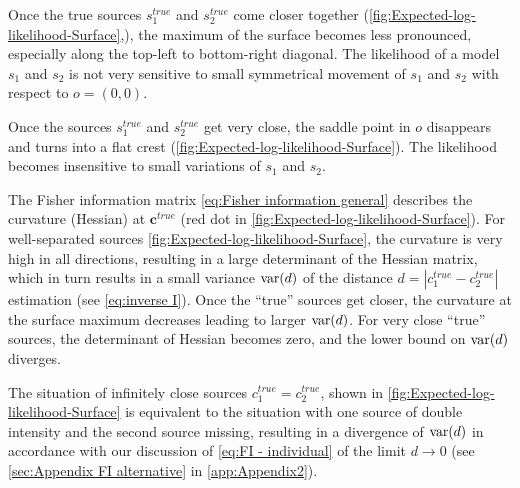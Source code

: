 Once the true sources $s_1^{true}$ and $s_2^{true}$ come closer together (\autoref{fig:Expected-log-likelihood-Surface}\bbb,\ccc), the maximum of the surface becomes less pronounced, especially along the top-left to bottom-right diagonal. The likelihood of a model $s_1$ and $s_2$ is not very sensitive to small symmetrical movement of $s_1$ and $s_2$ with respect to $o=(0,0)$. 

Once the sources $s_1^{true}$ and $s_2^{true}$ get very close, the saddle point in $o$ disappears and turns into a flat crest (\autoref{fig:Expected-log-likelihood-Surface}\ddd). The likelihood becomes insensitive to small variations of $s_1$ and $s_2$. 

The Fisher information matrix \autoref{eq:Fisher information general} describes the curvature (Hessian) at $\bm{c}^{true}$ (red dot in \autoref{fig:Expected-log-likelihood-Surface}\aaa). For well-separated sources \autoref{fig:Expected-log-likelihood-Surface}\aaa{}, the curvature is very high in all directions, resulting in a large determinant of the Hessian matrix, which in turn results in a small variance $\mathrm{var}(d)$ of the distance $d=\left|c_1^{true}-c_2^{true}\right|$ estimation  (see \autoref{eq:inverse I}). Once the ``true'' sources get closer, the curvature at the surface maximum decreases leading to larger $\mathrm{var}(d)$. For very close ``true'' sources, the determinant of Hessian becomes zero, and the lower bound on $\mathrm{var}(d)$ diverges. 

The situation of infinitely close sources $c_1^{true}=c_2^{true}$, shown in \autoref{fig:Expected-log-likelihood-Surface}\ddd{}  is equivalent to the situation with one source of double intensity and the second source missing, resulting in a divergence of $\mathrm{var}(d)$ in accordance with our discussion of \autoref{eq:FI - individual} of the limit $d\rightarrow 0$ (see \autoref{sec:Appendix FI alternative} in \autoref{app:Appendix2}).

